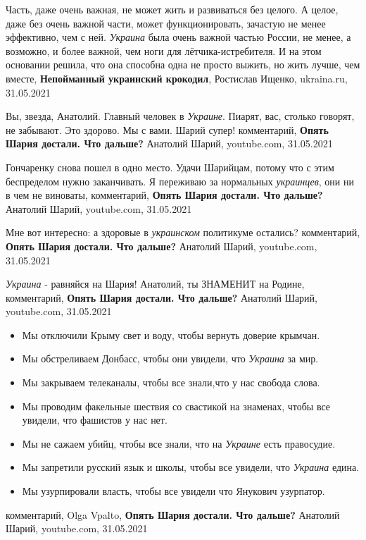 Часть, даже очень важная, не может жить и развиваться без целого. А целое, даже
без очень важной части, может функционировать, зачастую не менее эффективно,
чем с ней. \emph{Украина} была очень важной частью России, не менее, а
возможно, и более важной, чем ноги для лётчика-истребителя. И на этом основании
решила, что она способна одна не просто выжить, но жить лучше, чем вместе,
\textbf{Непойманный украинский крокодил}, Ростислав Ищенко, ukraina.ru,
31.05.2021

Вы, звезда, Анатолий. Главный человек в \emph{Украине}. Пиарят, вас, столько говорят,
не забывают. Это здорово. Мы с вами. Шарий супер!
комментарий, \textbf{Опять Шария достали. Что дальше?} Анатолий Шарий, youtube.com, 31.05.2021

Гончаренку снова пошел в одно место. Удачи Шарийцам, потому что с этим
беспределом нужно заканчивать.  Я переживаю за нормальных \emph{украинцев}, они ни в
чем не виноваты,
комментарий, \textbf{Опять Шария достали. Что дальше?} Анатолий Шарий, youtube.com, 31.05.2021

Мне вот интересно: а здоровые в \emph{украинском} политикуме остались?
комментарий, \textbf{Опять Шария достали. Что дальше?} Анатолий Шарий, youtube.com, 31.05.2021

\emph{Украина} - равняйся на Шария! Анатолий, ты ЗНАМЕНИТ на Родине,
комментарий, \textbf{Опять Шария достали. Что дальше?} Анатолий Шарий, youtube.com, 31.05.2021

\begin{itemize}
\item Мы отключили Крыму свет и воду, чтобы вернуть доверие крымчан. 
\item Мы обстреливаем Донбасс, чтобы они увидели, что \emph{Украина} за мир. 
\item Мы закрываем телеканалы, чтобы все знали,что у нас свобода слова. 
\item Мы проводим факельные шествия со свастикой на знаменах, чтобы все увидели, что фашистов у нас нет.
\item Мы не сажаем убийц, чтобы все знали, что на \emph{Украине} есть правосудие.
\item Мы запретили русский язык и школы, чтобы все увидели, что \emph{Украина} едина.
\item Мы узурпировали власть, чтобы все увидели что Янукович узурпатор.
\end{itemize}
комментарий,  Olga Vpalto, \textbf{Опять Шария достали. Что дальше?} Анатолий Шарий, youtube.com, 31.05.2021

